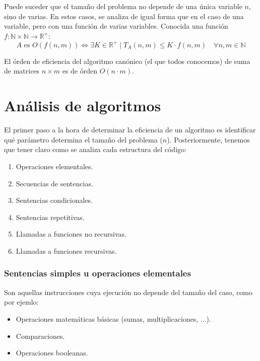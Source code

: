 Puede suceder que el tamaño del problema no depende de una única variable $n$, sino de varias.
En estos casos, se analiza de igual forma que en el caso de una variable, pero con una función de varias variables. Conocida una función $f:\mathbb{N}\times\mathbb{N}\rightarrow \mathbb{R}^{+}$:
\begin{equation*}
A \text{\ es\ } O(f(n,m)) \Longleftrightarrow \exists K \in \mathbb{R}^{+} \mid T_A(n,m) \leq K \cdot f(n,m)\quad \forall n,m\in \mathbb{N}
\end{equation*}

\begin{ejemplo}
El órden de eficiencia del algoritmo canónico (el que todos conocemos) de suma de matrices $n\times m$ es de órden $O(n\cdot m)$.
\end{ejemplo}

\section{Análisis de algoritmos}
El primer paso a la hora de determinar la eficiencia de un algoritmo es identificar qué parámetro determina el tamaño del problema ($n$).
Posteriormente, tenemos que tener claro como se analiza cada estructura del código:
\begin{enumerate}
    \item Operaciones elementales.
    \item Secuencias de sentencias.
    \item Sentencias condicionales.
    \item Sentencias repetitivas.
    \item Llamadas a funciones no recursivas.
    \item Llamadas a funciones recursivas.
\end{enumerate}

\subsubsection{Sentencias simples u operaciones elementales}
Son aquellas instrucciones cuya ejecución no depende del tamaño del caso, como por ejemlo:
\begin{itemize}
\item Operaciones matemáticas básicas (sumas, multiplicaciones, $\ldots$).
\item Comparaciones.
\item Operaciones booleanas.
\end{itemize}

